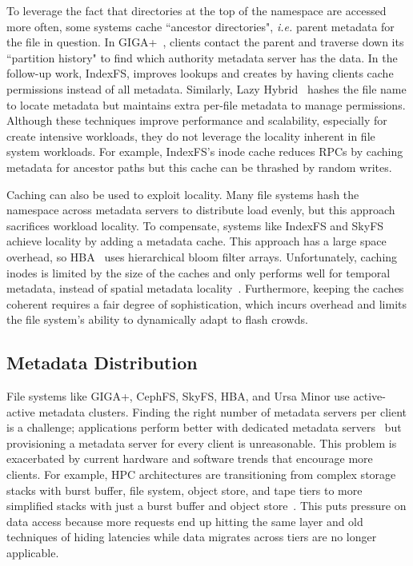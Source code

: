 To leverage the fact that directories at the top of the namespace are accessed
more often, some systems cache ``ancestor directories", {\it i.e.} parent
metadata for the file in question.  In GIGA+~\cite{patil:fast2011-giga+},
clients contact the parent and traverse down its ``partition history" to find
which authority metadata server has the data.  In the follow-up work, IndexFS,
improves lookups and creates by having clients cache permissions instead of all
metadata.  Similarly, Lazy Hybrid~\cite{brandt:msst2003-lh} hashes the file
name to locate metadata but maintains extra per-file metadata to manage
permissions.  Although these techniques improve performance and scalability,
especially for create intensive workloads, they do not leverage the locality
inherent in file system workloads.  For example, IndexFS's inode cache reduces
RPCs by caching metadata for ancestor paths but this cache can be thrashed by
random writes.

Caching can also be used to exploit locality.  Many file systems hash the
namespace across metadata servers to distribute load evenly, but this approach
sacrifices workload locality. To compensate, systems like IndexFS and
SkyFS~\cite{xing:sc2009-skyfs} achieve locality by adding a metadata cache.
This approach has a large space overhead, so HBA~\cite{zhu:pds2008-hba} uses
hierarchical bloom filter arrays. Unfortunately, caching inodes is limited by
the size of the caches and only performs well for temporal metadata, instead of
spatial metadata locality~\cite{weil:sc2004-dyn-metadata, sevilla:sc15-mantle,
li:msst2006-dynamic}.  Furthermore, keeping the caches coherent requires a fair
degree of sophistication, which incurs overhead and limits the file system's
ability to dynamically adapt to flash crowds.

\subsection{Metadata Distribution}

File systems like GIGA+, CephFS, SkyFS, HBA, and Ursa Minor use active-active
metadata clusters. Finding the right number of metadata servers per client is a
challenge; applications perform better with dedicated metadata
servers~\cite{sevilla:sc15-mantle, ren:sc2014-indexfs} but provisioning a
metadata server for every client is unreasonable.  This problem is exacerbated
by current hardware and software trends that encourage more clients. For
example, HPC architectures are transitioning from complex storage stacks with
burst buffer, file system, object store, and tape tiers to more simplified
stacks with just a burst buffer and object
store~\cite{bent:login16-hpc-trends}. This puts pressure on data access because
more requests end up hitting the same layer and old techniques of hiding
latencies while data migrates across tiers are no longer applicable.

